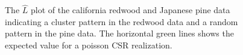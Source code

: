 \documentclass{article}\usepackage[]{graphicx}\usepackage[]{color}
\newenvironment{knitrout}{}{} %
\begin{document}
\begin{figure}
\begin{knitrout}
\end{knitrout}
\caption{The $\hat{L}$ plot of the california redwood and Japanese pine data indicating a cluster pattern in the  redwood data and a random pattern in the pine data.  The horizontal green lines shows the expected value for a poisson CSR realization.}
\label{lest}
\end{figure}
\end{document}
